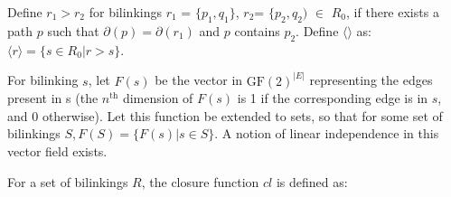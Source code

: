 \documentclass[sigplan,review,anonymous]{acmart}
\begin{document}
Define $r_1>r_2$ for bilinkings $r_1$ = $\{p_1,q_1\}$, $r_2$= $\{p_2, q_2)$ $\in$ $R_0$, if there exists a path $p$ such that $\partial(p) = \partial(r_1)$ and $p$ contains $p_2$.
Define $\langle\rangle$ as:
$\langle r \rangle = \{ s\in R_0| r>s\}$.

For bilinking $s$, let $F(s)$ be the vector in $\text{GF}(2)^{|E|}$ representing the edges present in s (the $n^{\text{th}}$ dimension of $F(s)$ is 1 if the corresponding edge is in $s$, and 0 otherwise).
Let this function be extended to sets, so that for some set of bilinkings $S, F(S) = \{ F(s) | s\in S \}$. A notion of linear independence in this vector field exists.

For a set of bilinkings $R$, the closure function $cl$ is defined as:
\end{document}
